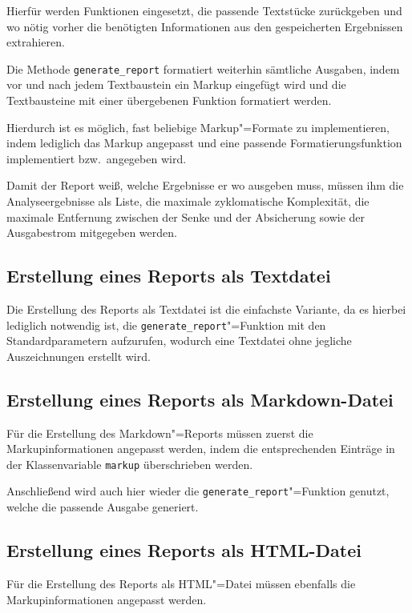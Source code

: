        Hierfür werden Funktionen eingesetzt,
        die passende Textstücke zurückgeben und
        wo nötig vorher die benötigten Informationen aus den gespeicherten Ergebnissen extrahieren.

        Die Methode
        \lstinline{generate_report} formatiert weiterhin sämtliche Ausgaben,
        indem vor und
        nach jedem Textbaustein ein Markup eingefügt wird und
        die Textbausteine mit einer übergebenen Funktion formatiert werden.

        Hierdurch ist es möglich,
        fast beliebige Markup"=Formate zu implementieren,
        indem lediglich das Markup angepasst und
        eine passende Formatierungsfunktion implementiert bzw.\ angegeben wird.

        Damit der Report weiß,
        welche Ergebnisse er wo ausgeben muss,
        müssen ihm die Analyseergebnisse als Liste,
        die maximale zyklomatische Komplexität,
        die maximale Entfernung zwischen der Senke und
        der Absicherung sowie
        der Ausgabestrom mitgegeben werden.

        \subsection{Erstellung eines Reports als Textdatei}
            Die Erstellung des Reports als Textdatei ist die einfachste Variante,
            da es hierbei lediglich notwendig ist,
            die
            \lstinline{generate_report}"=Funktion mit den Standardparametern aufzurufen,
            wodurch eine Textdatei ohne jegliche Auszeichnungen erstellt wird.

        \subsection{Erstellung eines Reports als Markdown-Datei}
            Für die Erstellung des Markdown"=Reports müssen zuerst die Markupinformationen angepasst werden,
            indem die entsprechenden Einträge in der Klassenvariable
            \lstinline{markup} überschrieben werden.

            Anschließend wird auch hier wieder die
            \lstinline{generate_report}"=Funktion genutzt,
            welche die passende Ausgabe generiert.

        \subsection{Erstellung eines Reports als HTML-Datei}
            Für die Erstellung des Reports als
            \gls{HTML}"=Datei müssen ebenfalls die Markupinformationen angepasst werden.

